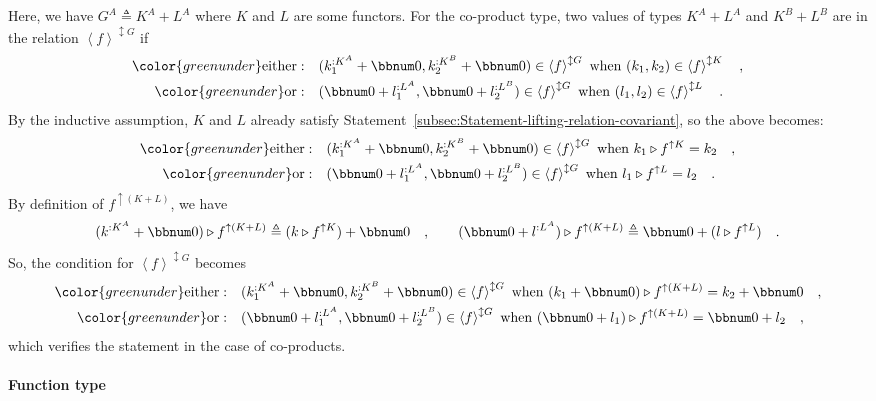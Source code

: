 Here, we have $G^{A}\triangleq K^{A}+L^{A}$ where $K$ and $L$ are
some functors. For the co-product type, two values of types $K^{A}+L^{A}$
and $K^{B}+L^{B}$ are in the relation $\left<f\right>^{\updownarrow G}$
if
\begin{align*}
{\color{greenunder}\text{either}:}\quad & (k_{1}^{:K^{A}}+\bbnum 0,k_{2}^{:K^{B}}+\bbnum 0)\in\left<f\right>^{\updownarrow G}\text{ when }(k_{1},k_{2})\in\left<f\right>^{\updownarrow K}\quad,\\
{\color{greenunder}\text{or}:}\quad & (\bbnum 0+l_{1}^{:L^{A}},\bbnum 0+l_{2}^{:L^{B}})\in\left<f\right>^{\updownarrow G}\text{ when }(l_{1},l_{2})\in\left<f\right>^{\updownarrow L}\quad.
\end{align*}
By the inductive assumption, $K$ and $L$ already satisfy Statement~\ref{subsec:Statement-lifting-relation-covariant},
so the above becomes:
\begin{align*}
{\color{greenunder}\text{either}:}\quad & (k_{1}^{:K^{A}}+\bbnum 0,k_{2}^{:K^{B}}+\bbnum 0)\in\left<f\right>^{\updownarrow G}\text{ when }k_{1}\triangleright f^{\uparrow K}=k_{2}\quad,\\
{\color{greenunder}\text{or}:}\quad & (\bbnum 0+l_{1}^{:L^{A}},\bbnum 0+l_{2}^{:L^{B}})\in\left<f\right>^{\updownarrow G}\text{ when }l_{1}\triangleright f^{\uparrow L}=l_{2}\quad.
\end{align*}
By definition of $f^{\uparrow(K+L)}$, we have 
\[
(k^{:K^{A}}+\bbnum 0)\triangleright f^{\uparrow(K+L)}\triangleq(k\triangleright f^{\uparrow K})+\bbnum 0\quad,\quad\quad(\bbnum 0+l^{:L^{A}})\triangleright f^{\uparrow(K+L)}\triangleq\bbnum 0+(l\triangleright f^{\uparrow L})\quad.
\]
So, the condition for $\left<f\right>^{\updownarrow G}$ becomes
\begin{align*}
{\color{greenunder}\text{either}:}\quad & (k_{1}^{:K^{A}}+\bbnum 0,k_{2}^{:K^{B}}+\bbnum 0)\in\left<f\right>^{\updownarrow G}\text{ when }(k_{1}+\bbnum 0)\triangleright f^{\uparrow(K+L)}=k_{2}+\bbnum 0\quad,\\
{\color{greenunder}\text{or}:}\quad & (\bbnum 0+l_{1}^{:L^{A}},\bbnum 0+l_{2}^{:L^{B}})\in\left<f\right>^{\updownarrow G}\text{ when }(\bbnum 0+l_{1})\triangleright f^{\uparrow(K+L)}=\bbnum 0+l_{2}\quad,
\end{align*}
which verifies the statement in the case of co-products.

\paragraph{Function type}

